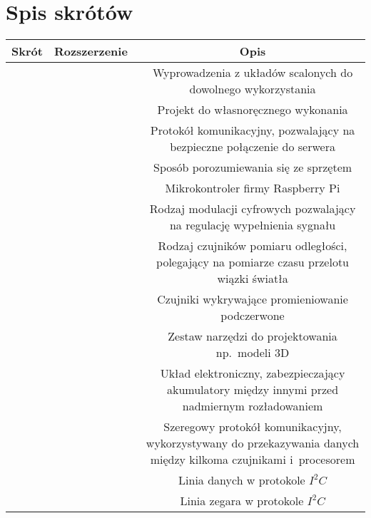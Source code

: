 \section*{Spis skrótów}
\begin{table*}[!ht]
    \begin{tabularx}{\textwidth}{|c|C|C|}\hline
        Skrót & Rozszerzenie\ & Opis\\\hline
               &  & Wyprowadzenia z układów scalonych do dowolnego wykorzystania\\\hline
                &  & Projekt do własnoręcznego wykonania\\\hline
                &  & Protokół komunikacyjny, pozwalający na bezpieczne połączenie do serwera\\\hline
                &  & Sposób porozumiewania się ze sprzętem\\\hline
         &  & Mikrokontroler firmy Raspberry Pi\\\hline
                &  & Rodzaj modulacji cyfrowych pozwalający na regulację wypełnienia sygnału\\\hline
                &  & Rodzaj czujników pomiaru odległości, polegający na pomiarze czasu przelotu wiązki światła\\\hline
                 &  & Czujniki wykrywające promieniowanie podczerwone\\\hline
                &  & Zestaw narzędzi do projektowania np.~modeli 3D\\\hline
                &  & Układ elektroniczny, zabezpieczający akumulatory między innymi przed nadmiernym rozładowaniem\\\hline
             &  & Szeregowy protokół komunikacyjny, wykorzystywany do przekazywania danych między kilkoma czujnikami i~procesorem\\\hline
              &  & Linia danych w protokole $I^2C$\\\hline
              &  & Linia zegara w protokole $I^2C$\\\hline
    \end{tabularx}
\end{table*}